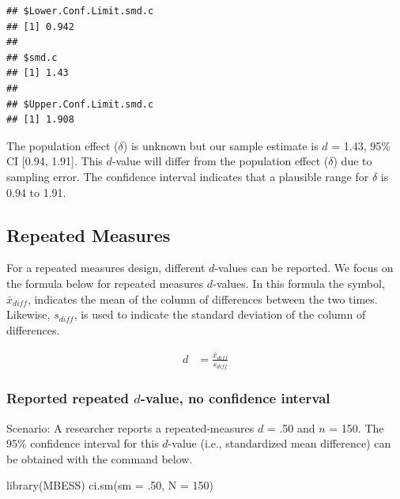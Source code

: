 \documentclass[
]{krantz}
\makeatletter
\newenvironment{Shaded}{\begin{snugshade}}{\end{snugshade}}
\newcommand{\AttributeTok}[1]{\textcolor[rgb]{0.61,0.61,0.61}{#1}}
\newcommand{\DecValTok}[1]{\textcolor[rgb]{0.06,0.06,0.06}{#1}}
\newcommand{\FunctionTok}[1]{\textcolor[rgb]{0,0,0}{#1}}
\newcommand{\NormalTok}[1]{#1}
\newenvironment{kframe}{%
\medskip{}
\setlength{\fboxsep}{.8em}
 \def\at@end@of@kframe{}%
 \ifinner\ifhmode%
  \def\at@end@of@kframe{\end{minipage}}%
  \begin{minipage}{\columnwidth}%
 \fi\fi%
 \def\FrameCommand##1{\hskip\@totalleftmargin \hskip-\fboxsep
 \colorbox{shadecolor}{##1}\hskip-\fboxsep
     \hskip-\linewidth \hskip-\@totalleftmargin \hskip\columnwidth}%
 \MakeFramed {\advance\hsize-\width
   \@totalleftmargin\z@ \linewidth\hsize
   \@setminipage}}%
 {\par\unskip\endMakeFramed%
 \at@end@of@kframe}
\renewenvironment{Shaded}{\begin{kframe}}{\end{kframe}}
\makeatother
\begin{document}
\begin{verbatim}
## $Lower.Conf.Limit.smd.c
## [1] 0.942
## 
## $smd.c
## [1] 1.43
## 
## $Upper.Conf.Limit.smd.c
## [1] 1.908
\end{verbatim}

The population effect (\(\delta\)) is unknown but our sample estimate is \(d\) = 1.43, 95\% CI {[}0.94, 1.91{]}. This \(d\)-value will differ from the population effect (\(\delta\)) due to sampling error. The confidence interval indicates that a plausible range for \(\delta\) is 0.94 to 1.91.

\hypertarget{repeated-measures}{%
\subsection{Repeated Measures}\label{repeated-measures}}

For a repeated measures design, different \(d\)-values can be reported. We focus on the formula below for repeated measures \(d\)-values. In this formula the symbol, \(\bar{x}_{diff}\), indicates the mean of the column of differences between the two times. Likewise, \(s_{diff}\), is used to indicate the standard deviation of the column of differences.

\[
\begin{aligned}
d & = \frac{\bar{x}_{diff}}{s_{diff}}
\end{aligned}
\]

\hypertarget{reported-repeated-d-value-no-confidence-interval}{%
\subsubsection{\texorpdfstring{Reported repeated \(d\)-value, no confidence interval}{Reported repeated d-value, no confidence interval}}\label{reported-repeated-d-value-no-confidence-interval}}

Scenario: A researcher reports a repeated-measures \(d\) = .50 and \(n\) = 150. The 95\% confidence interval for this \(d\)-value (i.e., standardized mean difference) can be obtained with the command below.

\begin{Shaded}
\begin{Highlighting}[]
\FunctionTok{library}\NormalTok{(MBESS)}
\FunctionTok{ci.sm}\NormalTok{(}\AttributeTok{sm =}\NormalTok{ .}\DecValTok{50}\NormalTok{, }\AttributeTok{N =} \DecValTok{150}\NormalTok{) }
\end{Highlighting}
\end{Shaded}
\end{document}
